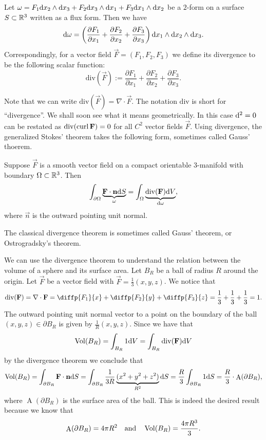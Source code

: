 \documentclass[11pt,a4paper]{article}
\DeclareMathOperator{\A}{A} %
\renewcommand{\div}{\mathrm{div}}
\begin{document}
\begin{definition}[Divergence]
  \label{def:div}
  Let $\omega = 
  F_1 \dx_2 \wedge \dx_3 + F_2 \dx_3 \wedge \dx_1 + F_3 \dx_1 \wedge \dx_2$
  be a $2$-form on a surface $S \subset \mathbb{R}^3$ written as a flux form.
  Then we have
  \[
    \dif \omega =
    \del{\frac{\partial F_1}{\partial x_1} + \frac{\partial F_2}{\partial x_2} + \frac{\partial F_3}{\partial x_3}} \dx_1 \wedge \dx_2 \wedge \dx_3.
  \]
  Correspondingly, for a vector field $\vec F = (F_1,F_2,F_3)$ we define
  its divergence to be the following scalar function:
  \[
    \div(\vec F) :=
    \frac{\partial F_1}{\partial x_1} + \frac{\partial F_2}{\partial x_2} + \frac{\partial F_3}{\partial x_3}.
  \]
\end{definition}
\begin{remark}
  \label{rmk:div-curl}
  Note that we can write $\div(\vec F) = \nabla \cdot \vec F$.
  The notation $\div$ is short for ``divergence''.
  We shall soon see what it means geometrically.
  In this case $\mathrm{d}^2 = 0$ can be restated as
  $\div(\curl \vec F) = 0$ for all $C^2$ vector fields $\vec F$.
  Using divergence, the generalized Stokes' theorem takes the following form,
  sometimes called Gauss' thoerem.
\end{remark}

\begin{theorem}
  Suppose $\vec F$ is a smooth vector field on a compact orientable
  $3$-manifold with boundary $\Omega \subset \mathbb{R}^3$.
  Then
  \[
    \int_{\partial \Omega} \underbrace{\vec F \cdot \vec n \dS}_{\omega} =
    \int_{\Omega} \underbrace{\div(\vec F) \dV}_{\dif \omega},
  \]
  where $\vec n$ is the outward pointing unit normal.
\end{theorem}
\begin{remark}
  The classical divergence theorem is sometimes called Gauss' theorem,
  or Ostrogradsky's theorem.
\end{remark}

\begin{example}
  We can use the divergence theorem to understand the relation between
  the volume of a sphere and its surface area.
  Let $B_R$ be a ball of radius $R$ around the origin.
  Let $\vec F$ be a vector field with $\vec F = \frac{1}{3} (x,y,z)$.
  We notice that
  \[
    \div(\vec F) = \nabla \cdot \vec F =
    \diffp{{F_1}}{x} +
    \diffp{{F_2}}{y} +
    \diffp{{F_3}}{z} = \frac{1}{3} + \frac{1}{3} + \frac{1}{3} = 1.
  \]
  The outward pointing
  unit normal vector to a point on the boundary of the ball
  $(x,y,z) \in \partial B_R$ is given by $\frac{1}{R} (x,y,z)$.
  Since we have that
  \[
    \Vol(B_R) =
    \int_{B_R} 1 \dV =
    \int_{B_R} \div(\vec F) \dV
  \]
  by the divergence theorem we conclude that
  \[
    \Vol(B_R) =
    \int_{\partial B_R} \vec F \cdot \vec n \dS =
    \int_{\partial B_R} \frac{1}{3R} \underbrace{(x^2 + y^2 + z^2)}_{R^2} \dS =
    \frac{R}{3} \int_{\partial B_R} 1 \dS =
    \frac{R}{3} \cdot \A(\partial B_R),
  \]
  where $\A(\partial B_R)$ is the surface area of the ball.
  This is indeed the desired result because we know that
  \[
    \A(\partial B_R) = 4 \pi R^2 \tand
    \Vol(B_R) = \frac{4 \pi R^3}{3}.
  \]
\end{example}
\end{document}
